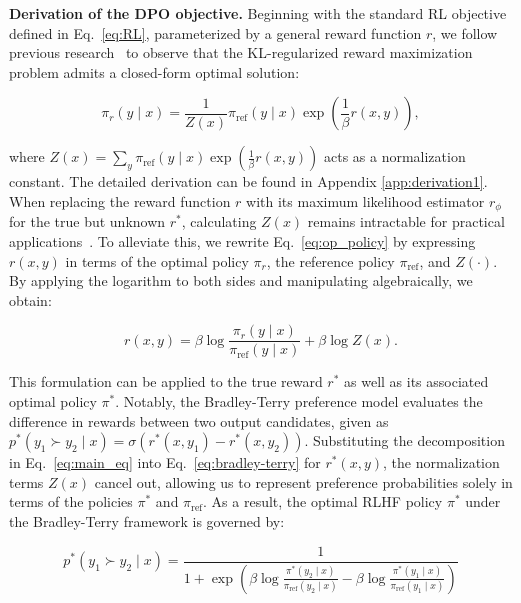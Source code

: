 \textbf{Derivation of the DPO objective.} Beginning with the standard RL objective defined in Eq.~\ref{eq:RL}, parameterized by a general reward function $r$, we follow previous research~\citep{peters2007reinforcement, peng2019advantage, korbak2022reinforcement, go2023aligning} to observe that the KL-regularized reward maximization problem admits a closed-form optimal solution:

\begin{equation}\label{eq:op_policy}
    \pi_r(y\mid x) = \frac{1}{Z(x)}\pi_\text{ref}(y\mid x)\exp\left(\frac{1}{\beta}r(x, y)\right),
\end{equation}

where $Z(x) =\sum_{y}\pi_\text{ref}(y\mid x)\exp\left(\frac{1}{\beta}r(x, y)\right)$ acts as a normalization constant. The detailed derivation can be found in Appendix \ref{app:derivation1}. When replacing the reward function $r$ with its maximum likelihood estimator $r_{\phi}$ for the true but unknown $r^*$, calculating $Z(x)$ remains intractable for practical applications~\citep{korbak2022reinforcement, go2023aligning}. To alleviate this, we rewrite Eq.~\ref{eq:op_policy} by expressing $r(x, y)$ in terms of the optimal policy $\pi_r$, the reference policy $\pi_\text{ref}$, and $Z(\cdot)$. By applying the logarithm to both sides and manipulating algebraically, we obtain:

\begin{equation}\label{eq:main_eq}
    r(x,y) =\beta \log \frac{\pi_r(y\mid x)}{\pi_\text{ref}(y\mid x)} + \beta \log Z(x).
\end{equation}

This formulation can be applied to the true reward $r^*$ as well as its associated optimal policy $\pi^*$. Notably, the Bradley-Terry preference model evaluates the difference in rewards between two output candidates, given as ${p^*(y_1 \succ y_2 \mid x) = \sigma(r^*(x, y_1) - r^*(x, y_2))}$. Substituting the decomposition in Eq.~\ref{eq:main_eq} into Eq.~\ref{eq:bradley-terry} for $r^*(x,y)$, the normalization terms $Z(x)$ cancel out, allowing us to represent preference probabilities solely in terms of the policies $\pi^*$ and $\pi_\text{ref}$. As a result, the optimal RLHF policy $\pi^*$ under the Bradley-Terry framework is governed by:

\begin{equation}\label{eq:objective}
    p^*(y_1\succ y_2 \mid x)=\frac{1}{1 + \exp\left(\beta \log \frac{\pi^*(y_2\mid x)}{\pi_\text{ref}(y_2\mid x)} - \beta \log \frac{\pi^*(y_1\mid x)}{\pi_\text{ref}(y_1\mid x)}\right)}
\end{equation}

